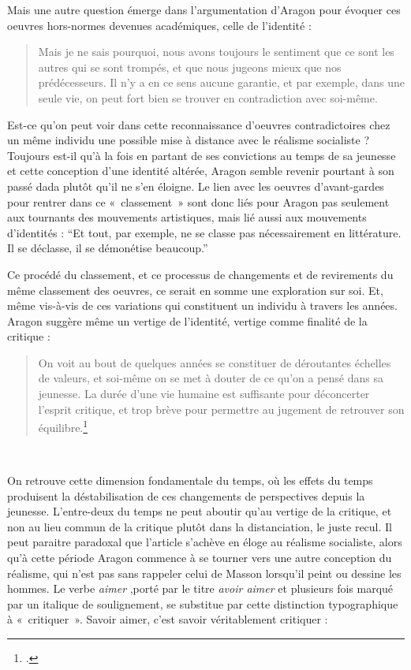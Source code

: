  Mais une autre question émerge dans l’argumentation d’Aragon pour évoquer ces oeuvres hors-normes devenues académiques, celle de l’identité :  
 \begin{quote}
  Mais je ne sais pourquoi, nous avons toujours le sentiment que ce sont les autres qui se sont trompés, et que nous jugeons mieux que nos prédécesseurs. Il n’y a en ce sens aucune garantie, et par exemple, dans une seule vie, on peut fort bien se trouver en contradiction avec soi-même.    
 \end{quote}

	Est-ce qu’on peut voir dans cette reconnaissance d’oeuvres contradictoires chez un même individu une possible mise à distance avec le réalisme socialiste ? Toujours est-il qu’à la fois en partant de ses convictions au temps de sa jeunesse et cette conception d’une identité altérée, Aragon semble revenir pourtant à son passé dada plutôt qu’il ne s’en éloigne. Le lien avec les oeuvres d’avant-gardes pour rentrer dans ce « classement » sont donc liés pour Aragon pas seulement aux tournants des mouvements artistiques, mais lié aussi aux mouvements d’identités : \enquote{Et tout, par exemple, ne se classe pas nécessairement en littérature. Il se déclasse, il se démonétise beaucoup.}

Ce procédé du classement, et ce processus de changements et de revirements du même classement des oeuvres, ce serait en somme une exploration sur soi. Et, même vis-à-vis de ces variations qui constituent un individu à travers les années. Aragon suggère même un vertige de l’identité, vertige comme finalité de la critique : 

\begin{quote}
 On voit au bout de quelques années se constituer de déroutantes échelles de valeurs, et soi-même on se met à douter de ce qu’on a pensé dans sa jeunesse. La durée d’une vie humaine est suffisante pour déconcerter l’esprit critique, et trop brève pour permettre au jugement de retrouver son équilibre.\footcite{savoiraimer}   
\end{quote}
 

	 On retrouve cette dimension fondamentale du temps, où les effets du temps produisent la déstabilisation de ces changements de perspectives depuis la jeunesse. L’entre-deux du temps ne peut aboutir qu’au vertige de la critique, et non au lieu commun de la critique plutôt dans la distanciation, le juste recul. Il peut paraitre paradoxal que l’article s’achève en éloge au réalisme socialiste, alors qu’à cette période Aragon commence à se tourner vers une autre conception du réalisme, qui n’est pas sans rappeler celui de Masson lorsqu’il peint ou dessine les hommes. Le verbe \emph{aimer} ,porté par le titre \emph{avoir aimer} et plusieurs fois marqué par un italique de soulignement, se substitue par cette distinction typographique à « critiquer ». Savoir aimer, c’est savoir véritablement critiquer :  

